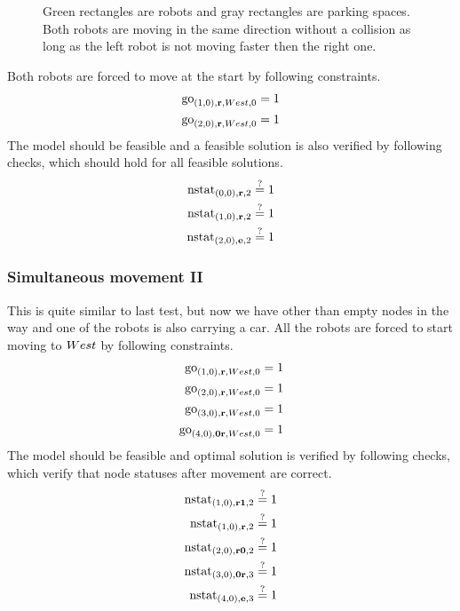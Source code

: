 \begin{figure}[h]
    \begin{center}
        
        \caption{Green rectangles are robots and gray rectangles are parking
            spaces. Both robots are moving in the same direction without a
            collision as long as the left robot is not moving faster then the right
        one.}
        \label{fig:simumove}
    \end{center}
\end{figure}

Both robots are forced to move at the start by following constraints.
\begin{align}
    \mathrm{go}_{(1,0),\text{\bf r},West,0} &= 1\\
    \mathrm{go}_{(2,0),\text{\bf r},West,0} &= 1
\end{align}
The model should be feasible and a feasible solution is also verified by following
checks, which should hold for all feasible solutions.
\begin{align}
    \mathrm{nstat}_{(0,0), \text{\bf r}, 2} &\overset{?}{=} 1\\
    \mathrm{nstat}_{(1,0), \text{\bf r}, 2} &\overset{?}{=} 1\\
    \mathrm{nstat}_{(2,0), \text{\bf e}, 2} &\overset{?}{=} 1
\end{align}

\subsubsection{Simultaneous movement II}
This is quite similar to last test, but now we have other than empty nodes in
the way and one of the robots is also carrying a car. All the robots are forced
to start moving to $West$ by following constraints.
\begin{align}
    \mathrm{go}_{(1,0),\text{\bf r},West,0} &= 1\\
    \mathrm{go}_{(2,0),\text{\bf r},West,0} &= 1\\
    \mathrm{go}_{(3,0),\text{\bf r},West,0} &= 1\\
    \mathrm{go}_{(4,0),\text{\bf 0r},West,0} &= 1
\end{align}
The model should be feasible and optimal solution is verified by following
checks, which verify that node statuses after movement are correct.
\begin{align}
    \mathrm{nstat}_{(1,0), \text{\bf r1}, 2} &\overset{?}{=} 1\\
    \mathrm{nstat}_{(1,0), \text{\bf r}, 2} &\overset{?}{=} 1\\
    \mathrm{nstat}_{(2,0), \text{\bf r0}, 2} &\overset{?}{=} 1\\
    \mathrm{nstat}_{(3,0), \text{\bf 0r}, 3} &\overset{?}{=} 1\\
    \mathrm{nstat}_{(4,0), \text{\bf e}, 3} &\overset{?}{=} 1
\end{align}

